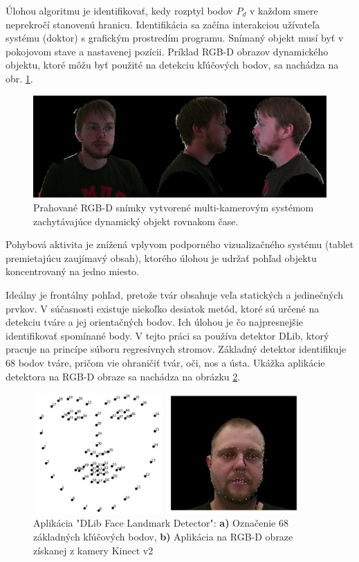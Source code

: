 Úlohou algoritmu je identifikovať, kedy rozptyl bodov $P_d$ v každom smere neprekročí stanovenú hranicu. Identifikácia sa začína interakciou užívateľa systému (doktor) s grafickým prostredím programu. Snímaný objekt musí byť v pokojovom stave a nastavenej pozícii. Príklad RGB-D obrazov dynamického objektu, ktoré môžu byť použité na detekciu kľúčových bodov, sa nachádza na obr. \ref{fig:dlib:views}. 

\begin{figure}[H]
	\centering
	\includegraphics[width=\textwidth]{figures/rgbd_views.png}
	\caption{Prahované RGB-D snímky vytvorené multi-kamerovým systémom zachytávajúce dynamický objekt rovnakom čase.}
	\label{fig:dlib:views}
\end{figure}

Pohybová aktivita je znížená vplyvom podporného vizualizačného systému (tablet premietajúcu zaujímavý obsah), ktorého úlohou je udržať pohľad objektu koncentrovaný na jedno miesto.

Ideálny je frontálny pohľad, pretože tvár obsahuje veľa statických a jedinečných prvkov. V súčasnosti existuje niekoľko desiatok metód, ktoré sú určené na detekciu tváre a jej orientačných bodov. Ich úlohou je čo najpresnejšie identifikovať spomínané body. V tejto práci sa používa detektor DLib, ktorý pracuje na princípe súboru regresívnych stromov.
Základný detektor identifikuje 68 bodov tváre, pričom vie ohraničiť tvár, oči, nos a ústa. Ukážka aplikácie detektora na RGB-D obraze sa nachádza na obrázku \ref{fig:dlib:points}.

\begin{figure}[H]
	\centering
	\includegraphics[width=0.9\textwidth]{figures/face_landmarks.png}
	\caption{Aplikácia "DLib Face Landmark Detector":  \textbf{ a)} Označenie 68 základných kľúčových bodov,  \textbf{ b)} Aplikácia na RGB-D obraze získanej z kamery Kinect v2}
	\label{fig:dlib:points}
\end{figure}
 
